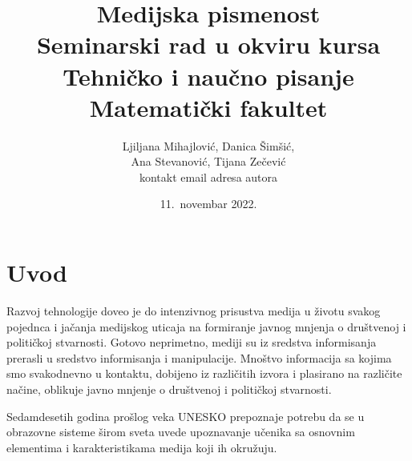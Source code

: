 \documentclass[a4paper]{article}
\begin{document}
\title{Medijska pismenost\\ \small{Seminarski rad u okviru kursa\\Tehničko i naučno pisanje\\ Matematički fakultet}}

\author{Ljiljana Mihajlović, Danica Šimšić,\\ Ana Stevanović, Tijana Zečević\\ kontakt email adresa autora}
\date{11.~novembar 2022.}
\maketitle


\tableofcontents

\newpage

\section{Uvod}
\label{sec:uvod}

Razvoj tehnologije doveo je do intenzivnog prisustva medija u životu svakog pojednca i jačanja medijskog uticaja na formiranje javnog mnjenja o društvenoj i političkoj stvarnosti. Gotovo neprimetno, mediji su iz sredstva informisanja prerasli u sredstvo informisanja i manipulacije. Mnoštvo informacija sa kojima smo svakodnevno u kontaktu, dobijeno iz različitih izvora i plasirano na različite načine, oblikuje javno mnjenje o društvenoj i političkoj stvarnosti.


Sedamdesetih godina prošlog veka UNESKO prepoznaje potrebu da se u obrazovne sisteme širom sveta uvede upoznavanje učenika sa osnovnim elementima i karakteristikama medija koji ih okružuju. 
\end{document}
